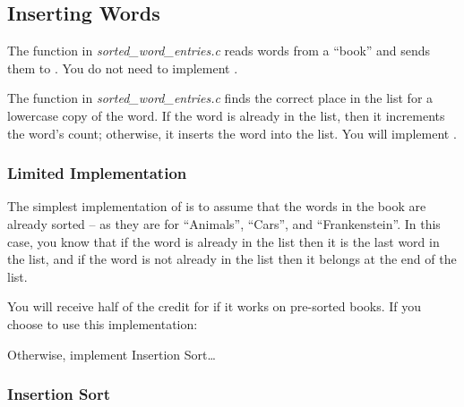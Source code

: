 \begin{description}
\end{description}


\subsection{Inserting Words}

The  function in \textit{sorted\_word\_entries.c} reads words from a ``book'' and sends them to .
You do not need to implement .

The  function in \textit{sorted\_word\_entries.c} finds the correct place in the list for a lowercase copy of the word.
If the word is already in the list, then it increments the word's count;
otherwise, it inserts the word into the list.
You will implement .

\subsubsection{Limited Implementation}

The simplest implementation of  is to assume that the words in the book are already sorted -- as they are for ``Animals'', ``Cars'', and ``Frankenstein''.
In this case, you know that if the word is already in the list then it is the last word in the list,
and if the word is not already in the list then it belongs at the end of the list.

You will receive half of the credit for  if it works on pre-sorted books.
If you choose to use this implementation:
\begin{description}
\end{description}

Otherwise, implement Insertion Sort\dots

\subsubsection{Insertion Sort}

